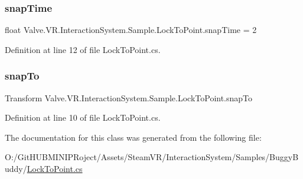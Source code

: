\subsubsection{\texorpdfstring{snapTime}{snapTime}}
{\footnotesize\ttfamily float Valve.\+V\+R.\+Interaction\+System.\+Sample.\+Lock\+To\+Point.\+snap\+Time = 2}



Definition at line 12 of file Lock\+To\+Point.\+cs.

\mbox{\label{class_valve_1_1_v_r_1_1_interaction_system_1_1_sample_1_1_lock_to_point_a84d46d3d4057f048cc6ebdd0beeae283}} 
\subsubsection{\texorpdfstring{snapTo}{snapTo}}
{\footnotesize\ttfamily Transform Valve.\+V\+R.\+Interaction\+System.\+Sample.\+Lock\+To\+Point.\+snap\+To}



Definition at line 10 of file Lock\+To\+Point.\+cs.



The documentation for this class was generated from the following file\+:\begin{DoxyCompactItemize}
\item 
O\+:/\+Git\+H\+U\+B\+M\+I\+N\+I\+P\+Roject/\+Assets/\+Steam\+V\+R/\+Interaction\+System/\+Samples/\+Buggy\+Buddy/\mbox{\hyperlink{_lock_to_point_8cs}{Lock\+To\+Point.\+cs}}\end{DoxyCompactItemize}
